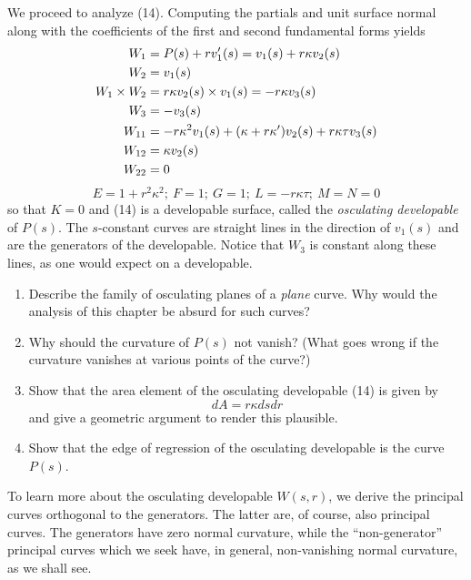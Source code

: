 \documentclass{book}
\begin{document}
We proceed to analyze (14). Computing the partials and unit surface normal along with the coefficients of the first and second fundamental forms yields
\begin{align}
W_{1} & = P(s) + rv'_{1}(s) = v_{1}(s) + r \kappa v_{2}(s) \\
W_{2} & = v_{1}(s) \\
W_{1} \times W_{2} & = r \kappa v_{2}(s) \times v_{1}(s) = - r \kappa v_{3}(s) \notag \\
W_{3} & = - v_{3}(s) \\
W_{11} & = - r \kappa^{2} v_{1}(s) + (\kappa + r \kappa ')v_{2}(s) + r \kappa \tau v_{3}(s) \notag \\
W_{12} & = \kappa v_{2}(s) \notag \\
W_{22} & = 0 \notag
\end{align}
\begin{equation}
E = 1 + r^{2} \kappa^{2};\ F = 1;\ G = 1;\ L = - r \kappa \tau;\ M = N = 0
\end{equation}
so that $K = 0$ and (14) is a developable surface, called the \emph{osculating developable} of $P(s)$. The $s$-constant curves are straight lines in the direction of $v_{1}(s)$ and are the generators of the developable. Notice that $W_{3}$ is constant along these lines, as one would expect on a developable.

\begin{enumerate}
  \item[11.] Describe the family of osculating planes of a \emph{plane} curve. Why would the analysis of this chapter be absurd for such curves?
  \item[12.] Why should the curvature of $P(s)$ not vanish? (What goes wrong if the curvature vanishes at various points of the curve?)
  \item[13.] Show that the area element of the osculating developable (14) is given by
    \begin{equation}
      dA = r \kappa ds dr
    \end{equation}
    and give a geometric argument to render this plausible.
  \item[14.] Show that the edge of regression of the osculating developable is the curve $P(s)$.
\end{enumerate}

To learn more about the osculating developable $W(s,r)$, we derive the principal curves orthogonal to the generators. The latter are, of course, also principal curves. The generators have zero normal curvature, while the ``non-generator'' principal curves which we seek have, in general, non-vanishing normal curvature, as we shall see.
\end{document}
